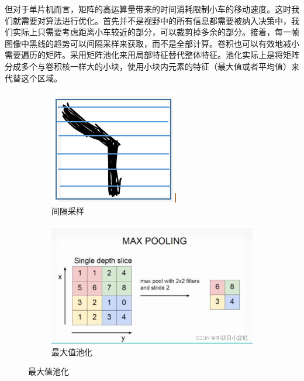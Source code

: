 \documentclass{report}
\begin{document}
但对于单片机而言，矩阵的高运算量带来的时间消耗限制小车的移动速度。这时我们就需要对算法进行优化。首先并不是视野中的所有信息都需要被纳入决策中，我们实际上只需要考虑距离小车较近的部分，可以裁剪掉多余的部分。接着，每一帧图像中黑线的趋势可以间隔采样来获取，而不是全部计算。卷积也可以有效地减小需要遍历的矩阵。采用矩阵池化来用局部特征替代整体特征。池化实际上是将矩阵分成多个与卷积核一样大的小块，使用小块内元素的特征（最大值或者平均值）来代替这个区域。
\begin{figure}[ht]
  \centering
 \begin{subfigure}[b]{0.4\textwidth}
   \centering
   \includegraphics[width=\textwidth]{figures/jumpscan.png}
   \caption{间隔采样}
   \label{fig:label}
 \end{subfigure}
 \hfill
 \begin{subfigure}[b]{0.4\textwidth}
   \centering
   \includegraphics[width=\textwidth]{figures/pooling.png}
   \caption{最大值池化}
   \label{fig:label}
 \end{subfigure}
 \hfill

\end{figure}
\end{document}
